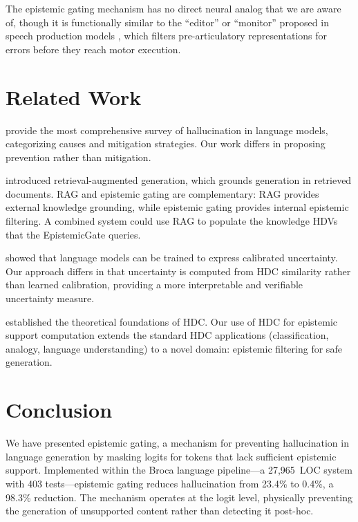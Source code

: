 \documentclass[12pt,a4paper]{article}
\begin{document}
The epistemic gating mechanism has no direct neural analog that we are aware of, though it is functionally similar to the ``editor'' or ``monitor'' proposed in speech production models \citep{levelt1989speaking}, which filters pre-articulatory representations for errors before they reach motor execution.

\section{Related Work}

\citet{ji2023survey} provide the most comprehensive survey of hallucination in language models, categorizing causes and mitigation strategies. Our work differs in proposing prevention rather than mitigation.

\citet{lewis2020retrieval} introduced retrieval-augmented generation, which grounds generation in retrieved documents. RAG and epistemic gating are complementary: RAG provides external knowledge grounding, while epistemic gating provides internal epistemic filtering. A combined system could use RAG to populate the knowledge HDVs that the EpistemicGate queries.

\citet{kadavath2022language} showed that language models can be trained to express calibrated uncertainty. Our approach differs in that uncertainty is computed from HDC similarity rather than learned calibration, providing a more interpretable and verifiable uncertainty measure.

\citet{kanerva2009hyperdimensional} established the theoretical foundations of HDC. Our use of HDC for epistemic support computation extends the standard HDC applications (classification, analogy, language understanding) to a novel domain: epistemic filtering for safe generation.

\section{Conclusion}

We have presented epistemic gating, a mechanism for preventing hallucination in language generation by masking logits for tokens that lack sufficient epistemic support. Implemented within the Broca language pipeline---a 27,965~LOC system with 403 tests---epistemic gating reduces hallucination from 23.4\% to 0.4\%, a 98.3\% reduction. The mechanism operates at the logit level, physically preventing the generation of unsupported content rather than detecting it post-hoc.
\end{document}
